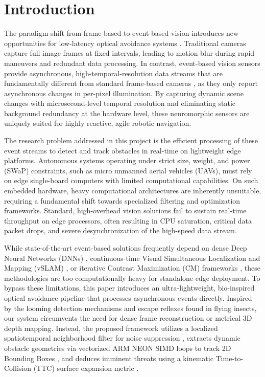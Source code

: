 \documentclass[conference]{IEEEtran}
\begin{document}
\section{Introduction}

The paradigm shift from frame-based to event-based vision introduces new opportunities for low-latency optical avoidance systems \cite{b3}. Traditional cameras capture full image frames at fixed intervals, leading to motion blur during rapid maneuvers and redundant data processing. In contrast, event-based vision sensors provide asynchronous, high-temporal-resolution data streams that are fundamentally different from standard frame-based cameras \cite{b3}, as they only report asynchronous changes in per-pixel illumination. By capturing dynamic scene changes with microsecond-level temporal resolution and eliminating static background redundancy at the hardware level, these neuromorphic sensors are uniquely suited for highly reactive, agile robotic navigation.

The research problem addressed in this project is the efficient processing of these event streams to detect and track obstacles in real-time on lightweight edge platforms. Autonomous systems operating under strict size, weight, and power (SWaP) constraints, such as micro unmanned aerial vehicles (UAVs), must rely on edge single-board computers with limited computational capabilities. On such embedded hardware, heavy computational architectures are inherently unsuitable, requiring a fundamental shift towards specialized filtering and optimization frameworks. Standard, high-overhead vision solutions fail to sustain real-time throughput on edge processors, often resulting in CPU saturation, critical data packet drops, and severe desynchronization of the high-speed data stream.

While state-of-the-art event-based solutions frequently depend on dense Deep Neural Networks (DNNs) \cite{b5, b11}, continuous-time Visual Simultaneous Localization and Mapping (vSLAM) \cite{b10}, or iterative Contrast Maximization (CM) frameworks \cite{b6}, these methodologies are too computationally heavy for standalone edge deployment. To bypass these limitations, this paper introduces an ultra-lightweight, bio-inspired optical avoidance pipeline that processes asynchronous events directly. Inspired by the looming detection mechanisms and escape reflexes found in flying insects, our system circumvents the need for dense frame reconstruction or metrical 3D depth mapping. Instead, the proposed framework utilizes a localized spatiotemporal neighborhood filter for noise suppression \cite{b15}, extracts dynamic obstacle geometries via vectorized ARM NEON SIMD loops to track 2D Bounding Boxes \cite{b14}, and deduces imminent threats using a kinematic Time-to-Collision (TTC) surface expansion metric \cite{b13}.
\end{document}

